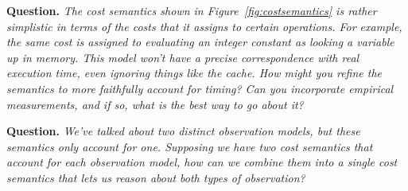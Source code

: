\documentclass[11pt,twoside]{scrartcl}
\begin{document}
\textbf{Question.} \emph{The cost semantics shown in Figure~\ref{fig:costsemantics} is rather simplistic in terms of the costs that it assigns to certain operations. For example, the same cost is assigned to evaluating an integer constant as looking a variable up in memory. This model won't have a precise correspondence with real execution time, even ignoring things like the cache. How might you refine the semantics to more faithfully account for timing? Can you incorporate empirical measurements, and if so, what is the best way to go about it?}

\textbf{Question.} \emph{We've talked about two distinct observation models, but these semantics only account for one. Supposing we have two cost semantics that account for each observation model, how can we combine them into a single cost semantics that lets us reason about both types of observation?}
\end{document}
